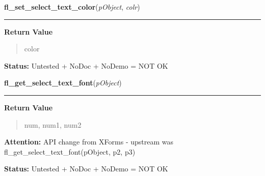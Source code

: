     \vspace{0.5ex}

\hspace{.8\funcindent}\begin{boxedminipage}{\funcwidth}

    \raggedright \textbf{fl\_set\_select\_text\_color}(\textit{pObject}, \textit{colr})

    \vspace{-1.5ex}

    \rule{\textwidth}{0.5\fboxrule}
\setlength{\parskip}{2ex}
\setlength{\parskip}{1ex}
      \textbf{Return Value}
    \vspace{-1ex}

      \begin{quote}
      color

      \end{quote}

\textbf{Status:} Untested + NoDoc + NoDemo = NOT OK



    \end{boxedminipage}

    \label{xformslib:library:fl_get_select_text_font}

    \vspace{0.5ex}

\hspace{.8\funcindent}\begin{boxedminipage}{\funcwidth}

    \raggedright \textbf{fl\_get\_select\_text\_font}(\textit{pObject})

    \vspace{-1.5ex}

    \rule{\textwidth}{0.5\fboxrule}
\setlength{\parskip}{2ex}
\setlength{\parskip}{1ex}
      \textbf{Return Value}
    \vspace{-1ex}

      \begin{quote}
      num, num1, num2

      \end{quote}

\textbf{Attention:} API change from XForms - upstream was fl\_get\_select\_text\_font(pObject, 
p2, p3)



\textbf{Status:} Untested + NoDoc + NoDemo = NOT OK



    \end{boxedminipage}

